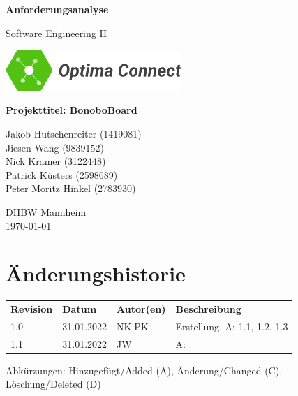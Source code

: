 \documentclass[a4paper,11pt]{scrartcl}
\begin{document}
\renewcommand*{\arraystretch}{1.2}
\begin{titlepage}
    \begin{center}
        \vspace*{1cm}\Huge
        \textbf{Anforderungsanalyse}\par                
        \vspace{0.5cm}\LARGE        
        Software Engineering II\par           
        \vspace{2cm}
        \includegraphics[width=0.5\textwidth]{OptimaLogo_long}\par   
        \vspace{1cm}
        \textbf{Projekttitel: BonoboBoard}\par        
        \vfill\Large   
        Jakob Hutschenreiter (1419081)\\Jiesen Wang (9839152)\\Nick Kramer (3122448)\\Patrick Küsters (2598689)\\Peter Moritz Hinkel (2783930)\par
        \vspace{2cm}
        DHBW Mannheim\\
        \today     
    \end{center}
\end{titlepage}

\section*{Änderungshistorie}
\begin{table}[h]
	\begin{tabular}{@{} p{20mm} p{25mm} p{25mm} p{75mm}}
		\textbf{Revision} & \textbf{Datum} & \textbf{Autor(en)} & \textbf{Beschreibung}\\
		1.0 & 31.01.2022 & NK|PK & Erstellung, A: 1.1, 1.2, 1.3\\
		1.1 & 31.01.2022 & JW & A: 
	\end{tabular}
\end{table}
\noindent
Abkürzungen: Hinzugefügt/Added (A), Änderung/Changed (C), Löschung/Deleted (D)
\vspace{2cm}
\tableofcontents
\newpage
{}
\end{document}
